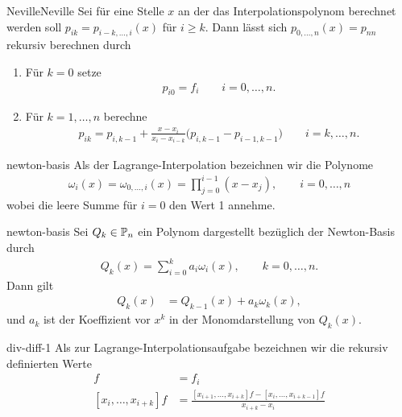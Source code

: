 \begin{Algorithmus*}{Neville}{Neville}
  Sei für eine Stelle $x$ an der das Interpolationspolynom berechnet
  werden soll $p_{ik} = p_{i-k,\dots,i}(x)$ für $i\ge k$. Dann lässt
  sich $p_{0,\dots,n}(x) = p_{nn}$ rekursiv berechnen durch
  \begin{enumerate}
  \item Für $k=0$ setze
    \begin{gather}
      p_{i0} = f_i \qquad i=0,\dots,n.
    \end{gather}
  \item Für $k=1,\dots,n$ berechne
    \begin{gather}
      p_{ik} = p_{i,k-1} + \frac{x-x_i}{x_i-x_{i-k}}
      \bigl( p_{i,k-1} - p_{i-1,k-1} \bigr)
      \qquad i=k,\dots,n.
    \end{gather}
  \end{enumerate}
\end{Algorithmus*}

\begin{Definition}{newton-basis}
  Als  der Lagrange-Interpolation bezeichnen wir
  die Polynome
  \begin{gather}
    \omega_i(x)
    = \omega_{0,\dots,i}(x)
    = \prod_{j=0}^{i-1} (x-x_j),
    \qquad i=0,\dots,n
  \end{gather}
  wobei die leere Summe für $i=0$ den Wert 1 annehme.
\end{Definition}

\begin{Lemma}{newton-basis}
  Sei $Q_k\in \P_n$ ein Polynom dargestellt bezüglich der Newton-Basis
  durch
  \begin{gather}
    Q_k(x) = \sum_{i=0}^k a_i \omega_i(x),\qquad k=0,\dots,n.
  \end{gather}
  Dann gilt
  \begin{align}
    Q_k(x) &= Q_{k-1}(x) + a_k \omega_k(x),
  \end{align}
  und $a_k$ ist der Koeffizient vor $x^k$ in der Monomdarstellung von
  $Q_k(x)$.
\end{Lemma}

\begin{Definition}{div-diff-1}
  Als  zur
  Lagrange-Interpolationsaufgabe bezeichnen wir die rekursiv
  definierten Werte
  \begin{align}
    [x_i]f
    &= f_i \\
    [x_i,\dots,x_{i+k}]f
    &= \frac{[x_{i+1},\dots,x_{i+k}]f - [x_i,\dots,x_{i+k-1}]f}{x_{i+k}-x_i}
  \end{align}
\end{Definition}

